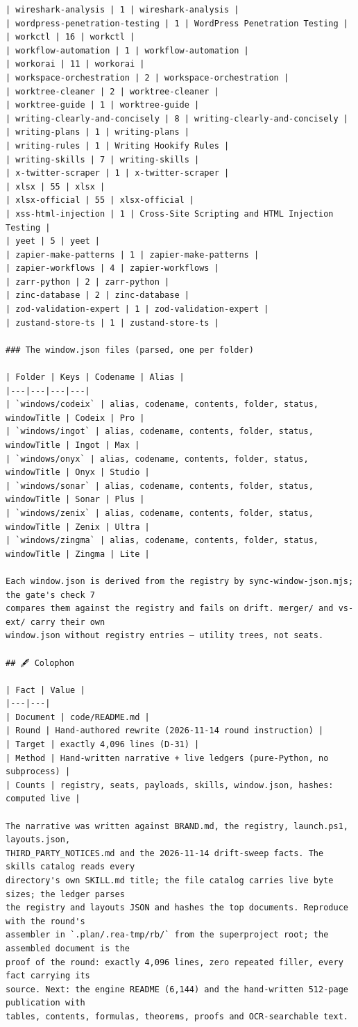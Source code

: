 \begin{Verbatim}[breaklines,breakanywhere,fontsize=\footnotesize]
| wireshark-analysis | 1 | wireshark-analysis |
| wordpress-penetration-testing | 1 | WordPress Penetration Testing |
| workctl | 16 | workctl |
| workflow-automation | 1 | workflow-automation |
| workorai | 11 | workorai |
| workspace-orchestration | 2 | workspace-orchestration |
| worktree-cleaner | 2 | worktree-cleaner |
| worktree-guide | 1 | worktree-guide |
| writing-clearly-and-concisely | 8 | writing-clearly-and-concisely |
| writing-plans | 1 | writing-plans |
| writing-rules | 1 | Writing Hookify Rules |
| writing-skills | 7 | writing-skills |
| x-twitter-scraper | 1 | x-twitter-scraper |
| xlsx | 55 | xlsx |
| xlsx-official | 55 | xlsx-official |
| xss-html-injection | 1 | Cross-Site Scripting and HTML Injection Testing |
| yeet | 5 | yeet |
| zapier-make-patterns | 1 | zapier-make-patterns |
| zapier-workflows | 4 | zapier-workflows |
| zarr-python | 2 | zarr-python |
| zinc-database | 2 | zinc-database |
| zod-validation-expert | 1 | zod-validation-expert |
| zustand-store-ts | 1 | zustand-store-ts |

### The window.json files (parsed, one per folder)

| Folder | Keys | Codename | Alias |
|---|---|---|---|
| `windows/codeix` | alias, codename, contents, folder, status, windowTitle | Codeix | Pro |
| `windows/ingot` | alias, codename, contents, folder, status, windowTitle | Ingot | Max |
| `windows/onyx` | alias, codename, contents, folder, status, windowTitle | Onyx | Studio |
| `windows/sonar` | alias, codename, contents, folder, status, windowTitle | Sonar | Plus |
| `windows/zenix` | alias, codename, contents, folder, status, windowTitle | Zenix | Ultra |
| `windows/zingma` | alias, codename, contents, folder, status, windowTitle | Zingma | Lite |

Each window.json is derived from the registry by sync-window-json.mjs; the gate's check 7
compares them against the registry and fails on drift. merger/ and vs-ext/ carry their own
window.json without registry entries — utility trees, not seats.

## 🖋️ Colophon

| Fact | Value |
|---|---|
| Document | code/README.md |
| Round | Hand-authored rewrite (2026-11-14 round instruction) |
| Target | exactly 4,096 lines (D-31) |
| Method | Hand-written narrative + live ledgers (pure-Python, no subprocess) |
| Counts | registry, seats, payloads, skills, window.json, hashes: computed live |

The narrative was written against BRAND.md, the registry, launch.ps1, layouts.json,
THIRD_PARTY_NOTICES.md and the 2026-11-14 drift-sweep facts. The skills catalog reads every
directory's own SKILL.md title; the file catalog carries live byte sizes; the ledger parses
the registry and layouts JSON and hashes the top documents. Reproduce with the round's
assembler in `.plan/.rea-tmp/rb/` from the superproject root; the assembled document is the
proof of the round: exactly 4,096 lines, zero repeated filler, every fact carrying its
source. Next: the engine README (6,144) and the hand-written 512-page publication with
tables, contents, formulas, theorems, proofs and OCR-searchable text.
\end{Verbatim}\endgroup
